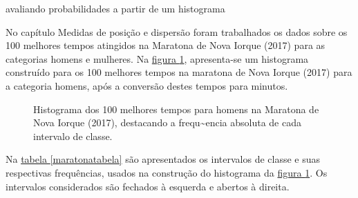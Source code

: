 \begin{task}{avaliando probabilidades a partir de um histograma}


No capítulo Medidas de posição e dispersão foram trabalhados os dados sobre os 100 melhores tempos atingidos na Maratona de Nova Iorque (2017) para as categorias homens e mulheres. Na \hyperref[maratona]{figura \ref{maratona}}, apresenta-se um histograma construído para os 100 melhores tempos na maratona de Nova Iorque (2017) para a categoria homens, após a conversão destes tempos para minutos.

\begin{figure}[H]
\centering

\caption{Histograma dos 100 melhores tempos para homens na Maratona de Nova Iorque (2017), destacando a frequ\textasciitilde{}encia absoluta de cada intervalo de classe.}
\label{maratona}
\end{figure}


Na \hyperref[maratonatabela]{
tabela \ref{maratonatabela}} são apresentados os intervalos de classe e suas respectivas frequências, usados na construção do histograma da \hyperref[maratona]{figura \ref{maratona}}. Os intervalos considerados são fechados à esquerda e abertos à direita.


\end{task}
